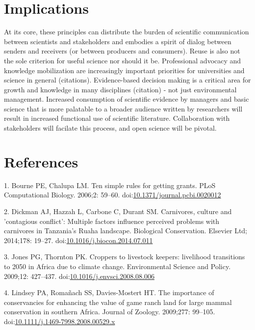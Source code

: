 \documentclass[10pt,letterpaper]{article}
\begin{document}
\section{Implications}\label{implications}

At its core, these principles can distribute the burden of scientific
communication between scientists and stakeholders and embodies a spirit
of dialog between senders and receivers (or between producers and
consumers). Reuse is also not the sole criterion for useful science nor
should it be. Professional advocacy and knowledge mobilization are
increasingly important priorities for universities and science in
general (citations). Evidence-based decision making is a critical area
for growth and knowledge in many disciplines (citation) - not just
environmental management. Increased consumption of scientific evidence
by managers and basic science that is more palatable to a broader
audience written by researchers will result in increased functional use
of scientific literature. Collaboration with stakeholders will facilate
this process, and open science will be pivotal.

\section*{References}\label{references}

\hypertarget{refs}{}
\hypertarget{ref-Bourne2006}{}
1. Bourne PE, Chalupa LM. Ten simple rules for getting grants. PLoS
Computational Biology. 2006;2: 59--60.
doi:\href{https://doi.org/10.1371/journal.pcbi.0020012}{10.1371/journal.pcbi.0020012}

\hypertarget{ref-Dickman2014}{}
2. Dickman AJ, Hazzah L, Carbone C, Durant SM. Carnivores, culture and
'contagious conflict': Multiple factors influence perceived problems
with carnivores in Tanzania's Ruaha landscape. Biological Conservation.
Elsevier Ltd; 2014;178: 19--27.
doi:\href{https://doi.org/10.1016/j.biocon.2014.07.011}{10.1016/j.biocon.2014.07.011}

\hypertarget{ref-Jones2009}{}
3. Jones PG, Thornton PK. Croppers to livestock keepers: livelihood
transitions to 2050 in Africa due to climate change. Environmental
Science and Policy. 2009;12: 427--437.
doi:\href{https://doi.org/10.1016/j.envsci.2008.08.006}{10.1016/j.envsci.2008.08.006}

\hypertarget{ref-Lindsey2009}{}
4. Lindsey PA, Romañach SS, Davies-Mostert HT. The importance of
conservancies for enhancing the value of game ranch land for large
mammal conservation in southern Africa. Journal of Zoology. 2009;277:
99--105.
doi:\href{https://doi.org/10.1111/j.1469-7998.2008.00529.x}{10.1111/j.1469-7998.2008.00529.x}
\end{document}

